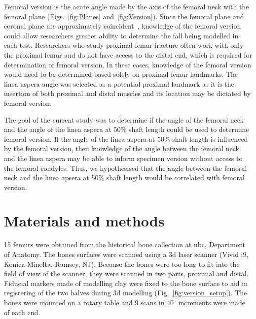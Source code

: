 Femoral version is the acute angle made by the axis of the femoral neck with the femoral plane (Figs.~\ref{fig:Planes} and~\ref{fig:Version}).
Since the femoral plane and coronal plane are approximately coincident~\citep{matsuda_femoral_1998, matsuda_anatomical_2004}, knowledge of the femoral version could allow researchers greater ability to determine the fall being modelled in each test.
Researchers who study proximal femur fracture often work with only the proximal femur and do not have access to the distal end, which is required for determination of femoral version.
In these cases, knowledge of the femoral version would need to be determined based solely on proximal femur landmarks.
The linea aspera angle was selected as a potential proximal landmark as it is the insertion of both proximal and distal muscles and its location may be dictated by femoral version.

The goal of the current study was to determine if the angle of the femoral neck and the angle of the linea aspera at 50\% shaft length could be used to determine femoral version.
If the angle of the linea aspera at 50\% shaft length is influenced by the femoral version, then knowledge of the angle between the femoral neck and the linea aspera may be able to inform specimen version without access to the femoral condyles.
Thus, we hypothesised that the angle between the femoral neck and the linea apsera at 50\% shaft length would be correlated with femoral version.

\section{Materials and methods}
\label{sec:version_methods}
15 femurs were obtained from the historical bone collection at \acs{ubc}, Department of Anatomy.
The bones surfaces were scanned using a \ac{3d} laser scanner (Vivid i9, Konica-Minolta, Ramsey, NJ).
Because the bones were too long to fit into the field of view of the scanner, they were scanned in two parts, proximal and distal.
Fiducial markers made of modelling clay were fixed to the bone surface to aid in registering of the two halves during \ac{3d} modelling (Fig.~\ref{fig:version_setup}).
The bones were mounted on a rotary table and 9 scans in 40$^\circ$ increments were made of each end.

